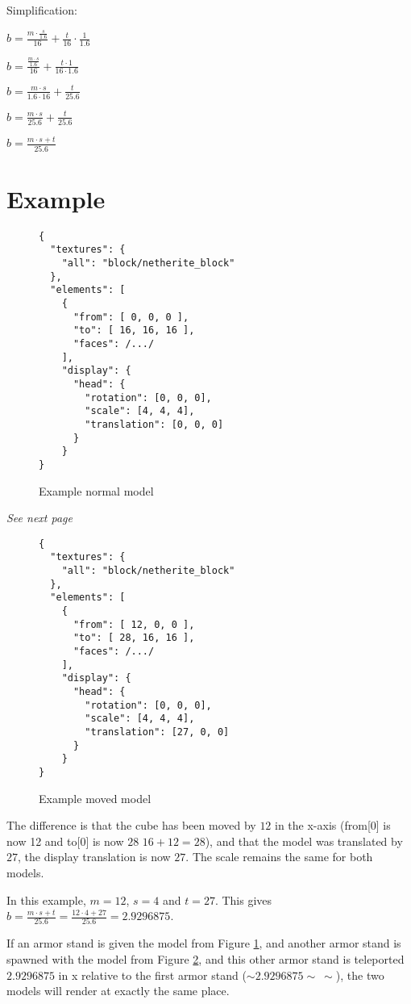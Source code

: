 \documentclass{article}
\begin{document}
Simplification:

$b=\frac{m\cdot \frac{s}{1.6}}{16}+\frac{t}{16}\cdot \frac{1}{1.6}$

$b=\frac{\frac{m\cdot s}{1.6}}{16}+\frac{t\cdot 1}{16\cdot 1.6}$

$b=\frac{m\cdot s}{1.6\cdot 16}+\frac{t}{25.6}$

$b=\frac{m\cdot s}{25.6}+\frac{t}{25.6}$

$b=\frac{m\cdot s+t}{25.6}$
\newpage
\section{Example}
\begin{figure}[h]
    \centering
    \begin{lstlisting}
{
  "textures": {
    "all": "block/netherite_block"
  },
  "elements": [
    {
      "from": [ 0, 0, 0 ],
      "to": [ 16, 16, 16 ],
      "faces": /.../
    ],
	"display": {
	  "head": {
	    "rotation": [0, 0, 0],
	    "scale": [4, 4, 4],
	    "translation": [0, 0, 0]
	  }
	}
}
    \end{lstlisting}
    \caption{Example normal model}
    \label{fig:example-normal}
\end{figure}

\emph{See next page}

\begin{figure}[h]
    \centering
    \begin{lstlisting}
{
  "textures": {
    "all": "block/netherite_block"
  },
  "elements": [
    {
      "from": [ 12, 0, 0 ],
      "to": [ 28, 16, 16 ],
      "faces": /.../
    ],
	"display": {
	  "head": {
	    "rotation": [0, 0, 0],
	    "scale": [4, 4, 4],
	    "translation": [27, 0, 0]
	  }
	}
}
    \end{lstlisting}
    \caption{Example moved model}
    \label{fig:example-moved}
\end{figure}
\newpage
The difference is that the cube has been moved by $12$ in the x-axis (from[0] is now 12 and to[0] is now $28$ $16+12=28$), and that the model was translated by $27$, the display translation is now $27$. The scale remains the same for both models.

In this example, $m=12$, $s=4$ and $t=27$. This gives $b=\frac{m\cdot s+t}{25.6}=\frac{12\cdot 4+27}{25.6}=2.9296875$.

If an armor stand is given the model from Figure \ref{fig:example-normal}, and another armor stand is spawned with the model from Figure \ref{fig:example-moved}, and this other armor stand is teleported $2.9296875$ in x relative to the first armor stand ($\sim2.9296875\sim\ \sim$), the two models will render at exactly the same place.
\end{document}
